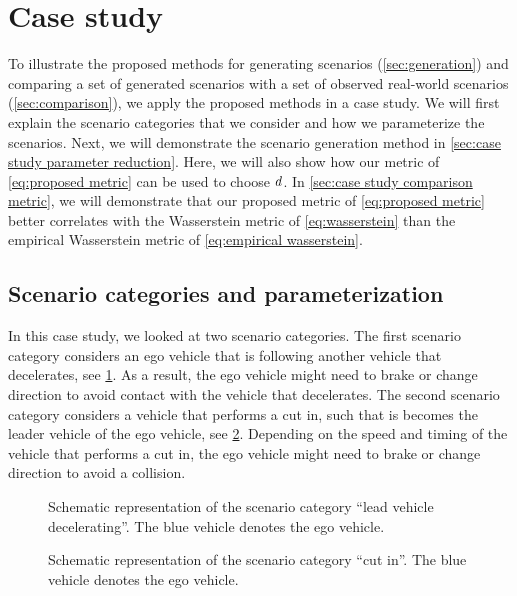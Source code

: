\section{Case study}
\label{sec:case study}

To illustrate the proposed methods for generating scenarios (\cref{sec:generation}) and comparing a set of generated scenarios with a set of observed real-world scenarios (\cref{sec:comparison}), we apply the proposed methods in a case study.
We will first explain the scenario categories that we consider and how we parameterize the scenarios.
Next, we will demonstrate the scenario generation method in \cref{sec:case study parameter reduction}. 
Here, we will also show how our metric of \cref{eq:proposed metric} can be used to choose $d$.
In \cref{sec:case study comparison metric}, we will demonstrate that our proposed metric of \cref{eq:proposed metric} better correlates with the Wasserstein metric of \cref{eq:wasserstein} than the empirical Wasserstein metric of \cref{eq:empirical wasserstein}.



\subsection{Scenario categories and parameterization}
\label{sec:case study intro}

In this case study, we looked at two scenario categories.
The first scenario category considers an ego vehicle that is following another vehicle that decelerates, see \cref{fig:lead vehicle decelerating}.
As a result, the ego vehicle might need to brake or change direction to avoid contact with the vehicle that decelerates.
The second scenario category considers a vehicle that performs a cut in, such that is becomes the leader vehicle of the ego vehicle, see \cref{fig:cut in}.
Depending on the speed and timing of the vehicle that performs a cut in, the ego vehicle might need to brake or change direction to avoid a collision.

\setlength{\figurewidth}{.99\linewidth}
\begin{figure}
	\centering
	
	\caption{Schematic representation of the scenario category ``lead vehicle decelerating''. The blue vehicle denotes the ego vehicle.}
	\label{fig:lead vehicle decelerating}
\end{figure}

\begin{figure}
	\centering
	
	\caption{Schematic representation of the scenario category ``cut in''. The blue vehicle denotes the ego vehicle.}
	\label{fig:cut in}
\end{figure}

